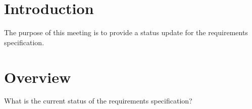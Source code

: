 \documentclass[11pt]{meetingmins}
\begin{document}
\maketitle

\section{Introduction}
The purpose of this meeting is to provide a status update for the requirements 
specification.

\section{Overview}
\begin{hiddenitems}

\item
What is the current status of the requirements specification?

\end{hiddenitems}
\end{document}
